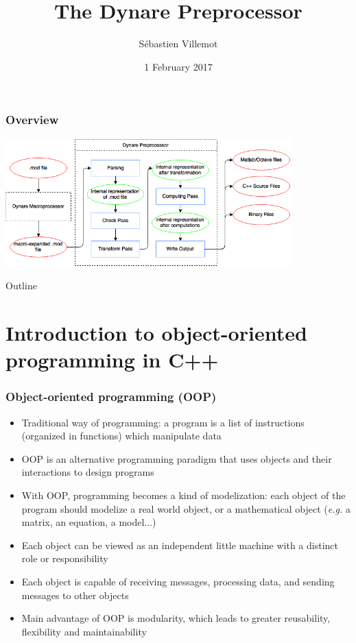 \documentclass{beamer}
\title{The Dynare Preprocessor}
\author[S. Villemot]{Sébastien Villemot}
\institute{CEPREMAP}
\date{1 February 2017}
\begin{document}
\begin{frame}
  \titlepage
\end{frame}

\begin{frame}
  \frametitle{Overview}
  \begin{center}
    \includegraphics[width=11cm]{overview.png}
  \end{center}
\end{frame}

\begin{frame}{Outline}
  \tableofcontents
\end{frame}

\section{Introduction to object-oriented programming in C++}

\begin{frame}
  \frametitle{Object-oriented programming (OOP)}
  \begin{itemize}
  \item Traditional way of programming: a program is a list of instructions (organized in functions) which manipulate data
  \item OOP is an alternative programming paradigm that uses \alert{objects} and their interactions to design programs
  \item With OOP, programming becomes a kind of modelization: each object of the program should modelize a real world object, or a mathematical object (\textit{e.g.} a matrix, an equation, a model...)
  \item Each object can be viewed as an independent little machine with a distinct role or responsibility
  \item Each object is capable of receiving messages, processing data, and sending messages to other objects
  \item Main advantage of OOP is \alert{modularity}, which leads to greater reusability, flexibility and maintainability
  \end{itemize}
\end{frame}
\end{document}
